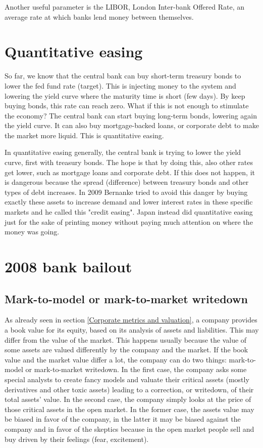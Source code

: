 Another useful parameter is the LIBOR, London Inter-bank Offered Rate, an average rate at which banks lend money between themselves.

\section{Quantitative easing}

So far, we know that the central bank can buy short-term treasury bonds to lower the fed fund rate (target). This is injecting money to the system and lowering the yield curve where the maturity time is short (few days). By keep buying bonds, this rate can reach zero. What if this is not enough to stimulate the economy? The central bank can start buying long-term bonds, lowering again the yield curve. It can also buy mortgage-backed loans, or corporate debt to make the market more liquid. This is quantitative easing. 

In quantitative easing generally, the central bank is trying to lower the yield curve, first with treasury bonds. The hope is that by doing this, also other rates get lower, such as mortgage loans and corporate debt. If this does not happen, it is dangerous because the spread (difference) between treasury bonds and other types of debt increases. In 2009 Bernanke tried to avoid this danger by buying exactly these assets to increase demand and lower interest rates in these specific markets and he called this "credit easing". Japan instead did quantitative easing just for the sake of printing money without paying much attention on where the money was going.

\section{2008 bank bailout}

\subsection{Mark-to-model or mark-to-market writedown}
As already seen in section \ref{Corporate metrics and valuation}, a company provides a book value for its equity, based on its analysis of assets and liabilities. This may differ from the value of the market. This happens usually because the value of some assets are valued differently by the company and the market. If the book value and the market value differ a lot, the company can do two things: mark-to-model or mark-to-market writedown. In the first case, the company asks some special analysts to create fancy models and valuate their critical assets (mostly derivatives and other toxic assets) leading to a correction, or writedown, of their total assets' value. In the second case, the company simply looks at the price of those critical assets in the open market. In the former case, the assets value may be biased in favor of the company, in the latter it may be biased against the company and in favor of the skeptics because in the open market people sell and buy driven by their feelings (fear, excitement).

